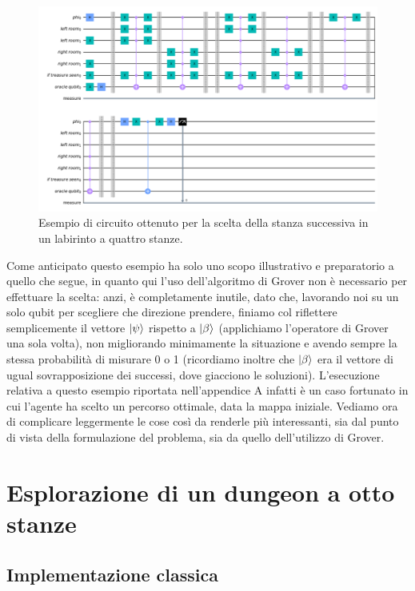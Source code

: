 \documentclass{book}
\theoremstyle{definition}
\theoremstyle{definition}
\theoremstyle{definition}
\theoremstyle{plain}
\theoremstyle{plain}
\theoremstyle{plain}
\theoremstyle{plain}
\begin{document}
\begin{figure}[H]
\captionsetup{font=scriptsize}
\begin{center}
    \includegraphics[width=16cm]{Immagini troppo complicate/2x2_labyrinth_first_circuit.png}
\end{center}
\caption{\scriptsize Esempio di circuito ottenuto per la scelta della stanza successiva in un labirinto a quattro stanze.}\label{fig:circ_2x2}
\end{figure}
\noindent Come anticipato questo esempio ha solo uno scopo illustrativo e preparatorio a quello che segue, in quanto qui l'uso dell'algoritmo di Grover non è necessario per effettuare la scelta: anzi, è completamente inutile, dato che, lavorando noi su un solo qubit per scegliere che direzione prendere, finiamo col riflettere semplicemente il vettore $\ket{\psi}$ rispetto a $\ket{\beta}$ (applichiamo l'operatore di Grover una sola volta), non migliorando minimamente la situazione e avendo sempre la stessa probabilità di misurare 0 o 1 (ricordiamo inoltre che $\ket{\beta}$ era il vettore di ugual sovrapposizione dei successi, dove giacciono le soluzioni). L'esecuzione relativa a questo esempio riportata nell'appendice A infatti è un caso fortunato in cui l'agente ha scelto un percorso ottimale, data la mappa iniziale. Vediamo ora di complicare leggermente le cose così da renderle più interessanti, sia dal punto di vista della formulazione del problema, sia da quello dell'utilizzo di Grover.

\section{Esplorazione di un dungeon a otto stanze}
\subsection{Implementazione classica}
\end{document}
